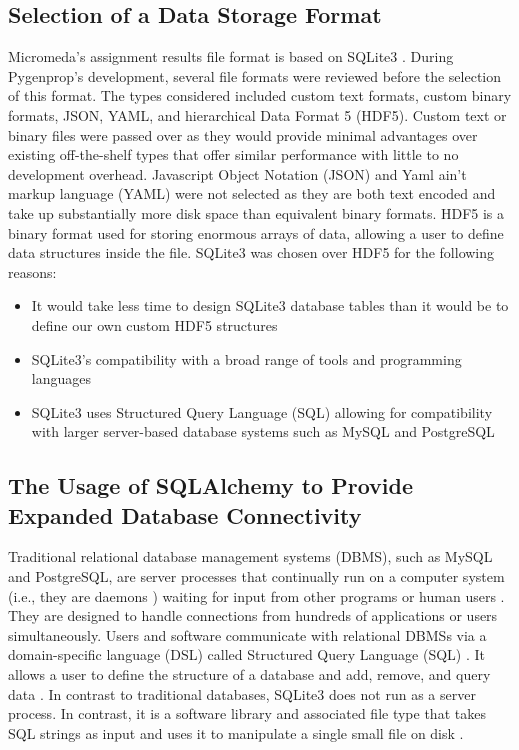 \subsection{Selection of a Data Storage Format}

Micromeda's assignment results file format is based on SQLite3 \cite{owens2006definitive}. During Pygenprop's development, several file formats were reviewed before the selection of this format. The types considered included custom text formats, custom binary formats, JSON, YAML, and hierarchical Data Format 5 (HDF5). Custom text or binary files were passed over as they would provide minimal advantages over existing off-the-shelf types that offer similar performance with little to no development overhead. Javascript Object Notation (JSON) and Yaml ain't markup language (YAML) \cite{ben2005yaml} were not selected as they are both text encoded and take up substantially more disk space than equivalent binary formats. HDF5 \cite{folk2011overview} is a binary format used for storing enormous arrays of data, allowing a user to define data structures inside the file. SQLite3 was chosen over HDF5 for the following reasons:

\begin{itemize}
\item It would take less time to design SQLite3 database tables than it would be to define our own custom HDF5 structures
\item SQLite3's compatibility with a broad range of tools and programming languages
\item SQLite3 uses Structured Query Language (SQL) allowing for compatibility with larger server-based database systems such as MySQL \cite{dubois1999mysql} and PostgreSQL \cite{momjian2001postgresql, owens2006definitive}
\end{itemize}

\subsection{The Usage of SQLAlchemy to Provide Expanded Database Connectivity} \label{SQLAlchemy}

Traditional relational database management systems (DBMS), such as MySQL and PostgreSQL, are server processes that continually run on a computer system (i.e., they are daemons \cite{martin2006computer}) waiting for input from other programs or human users \cite{dubois1999mysql, momjian2001postgresql}. They are designed to handle connections from hundreds of applications or users simultaneously. Users and software communicate with relational DBMSs via a domain-specific language (DSL) called Structured Query Language (SQL) \cite{sql1987guide}. It allows a user to define the structure of a database and add, remove, and query data \cite{sql1987guide}. In contrast to traditional databases, SQLite3 does not run as a server process. In contrast, it is a software library and associated file type that takes SQL strings as input and uses it to manipulate a single small file on disk \cite{owens2006definitive}.

